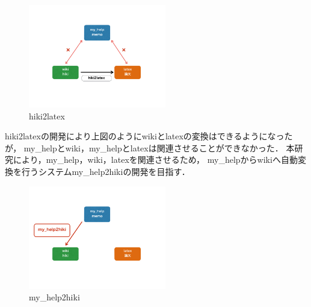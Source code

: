 \begin{figure}[htbp]\begin{center}
\includegraphics[width=6cm,bb=0 0 442 500]{../figs/./my_help2hiki_saki.004.png}
\caption{ hiki2latex}
\label{default}\end{center}\end{figure}
hiki2latexの開発により上図のようにwikiとlatexの変換はできるようになったが，
my\_helpとwiki，my\_helpとlatexは関連させることができなかった．
本研究により，my\_help，wiki，latexを関連させるため，
my\_helpからwikiへ自動変換を行うシステムmy\_help2hikiの開発を目指す．

\begin{figure}[htbp]\begin{center}
\includegraphics[width=6cm,bb=0 0 442 500]{../figs/./my_help2hiki_saki.005.png}
\caption{my\_help2hiki}
\label{default}\end{center}\end{figure}

